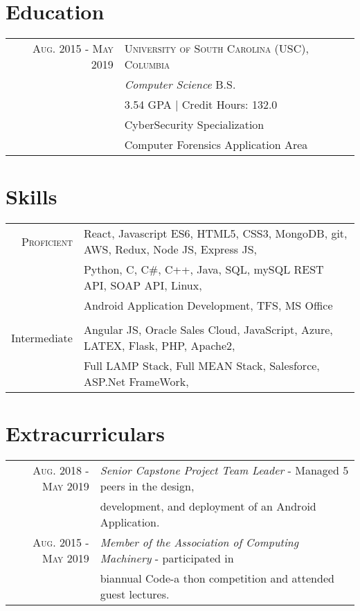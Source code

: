 \documentclass[a4paper,10pt]{article}
\begin{document}
\section{Education}
\begin{tabular}{r|l}	
\textsc{Aug. 2015 - May 2019     }    & \textsc{University of South Carolina (USC), Columbia}\\ &\emph{Computer Science} B.S. \\
& \footnotesize{3.54 GPA | Credit Hours: 132.0 }\\
& \footnotesize{CyberSecurity Specialization} \\
& \footnotesize{Computer Forensics Application Area } 
\end{tabular}
\section{Skills}
\begin{tabular}{r|l}
\textsc{Proficient     }& React, Javascript ES6, HTML5, CSS3, MongoDB, git, AWS, Redux, Node JS, Express JS,\\& Python, C, C\#, C++, Java, SQL, mySQL REST API, SOAP API, Linux,\\& Android Application Development, TFS, MS Office\\ 
\\
Intermediate &  Angular JS, Oracle Sales Cloud, JavaScript, Azure, LATEX, Flask, PHP, Apache2,\\& Full LAMP Stack, Full MEAN Stack, Salesforce, ASP.Net FrameWork,

\end{tabular}

\section{Extracurriculars}
\begin{tabular}{r|l}
 \textsc{Aug.} 2018 - \textsc{May} 2019  &  \emph{Senior Capstone Project Team Leader} - Managed 5 peers in the design, \\& development, and deployment of an Android Application. 
\\
 \textsc{Aug.} 2015 - \textsc{May} 2019   & \emph{Member of the Association of Computing Machinery} - participated in \\& biannual Code-a thon competition and attended guest lectures. \\
\end{tabular}
\end{document}
